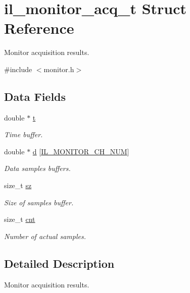 \hypertarget{structil__monitor__acq__t}{}\section{il\+\_\+monitor\+\_\+acq\+\_\+t Struct Reference}
\label{structil__monitor__acq__t}


Monitor acquisition results.  




{\ttfamily \#include $<$monitor.\+h$>$}

\subsection*{Data Fields}
\begin{DoxyCompactItemize}
\item 
double $\ast$ \hyperlink{structil__monitor__acq__t_a80f1fa100ff681ce19657ec1d91e0423}{t}
\begin{DoxyCompactList}\small\item\em Time buffer. \end{DoxyCompactList}\item 
double $\ast$ \hyperlink{structil__monitor__acq__t_adbc831472b0744d1a14b52f34388314f}{d} \mbox{[}\hyperlink{group__IL__MONITOR_ga05007f227fb5f253ed8ba714c0efb2cd}{I\+L\+\_\+\+M\+O\+N\+I\+T\+O\+R\+\_\+\+C\+H\+\_\+\+N\+UM}\mbox{]}
\begin{DoxyCompactList}\small\item\em Data samples buffers. \end{DoxyCompactList}\item 
size\+\_\+t \hyperlink{structil__monitor__acq__t_a1abcafb439ed9802b75afe08b5d48cea}{sz}
\begin{DoxyCompactList}\small\item\em Size of samples buffer. \end{DoxyCompactList}\item 
size\+\_\+t \hyperlink{structil__monitor__acq__t_a82be21ff5f08413736841b02666823ad}{cnt}
\begin{DoxyCompactList}\small\item\em Number of actual samples. \end{DoxyCompactList}\end{DoxyCompactItemize}


\subsection{Detailed Description}
Monitor acquisition results. 


